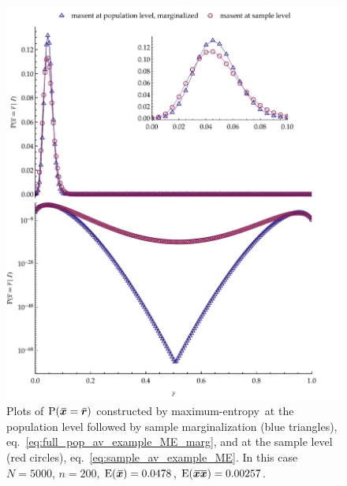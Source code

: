 \documentclass{article}
\theoremstyle{remark}
\theoremstyle{innote}
\renewcommand*{\|}{\mathpunct{|}}%
\newcommand*{\p}{\mathrm{P}}%
\newcommand*{\eqn}{eq.}%
\newcommand*{\E}{\mathrm{E}}
\DeclarePairedDelimiter\expp{(}{)}
\newcommand*{\expe}{\E\expp}%
\theoremstyle{simple}
\newcommand*{\widebar}[1]{{\mkern1.5mu\skew{2}\overline{\mkern-1.5mu#1\mkern-1.5mu}\mkern 1.5mu}}
\newcommand*{\sav}{\widebar} %
\newcommand*{\yxx}{x}%
\newcommand*{\yx}{\bm{\yxx}}%
\newcommand*{\yxs}{\sav{\yx}}%
\newcommand*{\yxxs}{\sav{\yx\yx}}%
\newcommand*{\yr}{\bm{r}}%
\newcommand*{\yrs}{\sav{\yr}}%
\newcommand*{\me}{maximum-entropy}
\begin{document}
\begin{figure}[!t]
\centering
\includegraphics[width=0.99\linewidth]{different_maxent_pop_sample_200_realdata_2mom.pdf}%
\caption{Plots of $\p(\yxs = \yrs)$ constructed by \me\ at the population
  level followed by sample marginalization (blue triangles),
  \eqn~\eqref{eq:full_pop_av_example_ME_marg}, and at the sample level (red
  circles), \eqn~\eqref{eq:sample_av_example_ME}. In this case $N=5000$,
  $n=200$, $\expe{\yxs}=0.0478$, $\expe{\yxxs}=0.00257$.}
\label{fig:diff_maxent_pop_sample}
\end{figure}%
\end{document}
